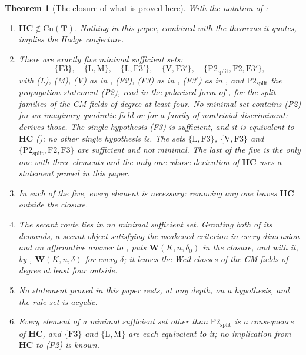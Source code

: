 \documentclass[11pt,reqno]{amsart}
\theoremstyle{plain}
\newtheorem{theorem}{Theorem}[section]
\theoremstyle{definition}
\theoremstyle{remark}
\newcommand{\Cn}{\mathrm{Cn}}
\begin{document}
\begin{theorem}[The closure of what is proved here]\label{thm:closure}
With the notation of :
\begin{enumerate}[label=\textup{(\roman*)},leftmargin=2.6em]
\item $\mathbf{HC}\notin\Cn(\mathbf{T})$. Nothing in this paper, combined with the
  theorems it quotes, implies the Hodge conjecture.
\item There are exactly five minimal sufficient sets:
  \[
    \{\mathrm{F3}\},\quad\{\mathrm{L},\mathrm{M}\},\quad
    \{\mathrm{L},\mathrm{F3}'\},\quad\{\mathrm{V},\mathrm{F3}'\},\quad
    \{\mathrm{P2}_{\mathrm{split}},\mathrm{F2},\mathrm{F3}'\},
  \]
  with \textup{(L)}, \textup{(M)}, \textup{(V)} as in ,
  \textup{(F2)}, \textup{(F3)} as in , (F3$'$) as in
  , and $\mathrm{P2}_{\mathrm{split}}$ the propagation
  statement \textup{(P2)}, read in the polarised form of \cite[Remark~3.6]{paperII},
  for the split families of the CM fields of degree at least four. No
  minimal set contains \textup{(P2)} for an imaginary quadratic field or for
  a family of nontrivial discriminant:  derives those.
  The single hypothesis (F3) is sufficient, and it is equivalent to
  $\mathbf{HC}$ (); no other single hypothesis is.
  The sets $\{\mathrm{L},\mathrm{F3}\}$, $\{\mathrm{V},\mathrm{F3}\}$ and
  $\{\mathrm{P2}_{\mathrm{split}},\mathrm{F2},\mathrm{F3}\}$ are sufficient and
  not minimal. The last of the five is the only one with three elements and the
  only one whose derivation of $\mathbf{HC}$ uses a statement proved in this
  paper.
\item In each of the five, every element is necessary: removing any one
  leaves $\mathbf{HC}$ outside the closure.
\item The secant route lies in no minimal sufficient set. Granting both of its
  demands, a secant object satisfying the weakened criterion in every
  dimension and an affirmative answer to \cite[Question 11.4]{Mar25b}, puts
  $\mathbf{W}(K,n,\delta_{0})$ in the closure, and with it, by
  , $\mathbf{W}(K,n,\delta)$ for every $\delta$; it leaves
  the Weil classes of the CM fields of degree at least four outside.
\item No statement proved in this paper rests, at any depth, on a
  hypothesis, and the rule set is acyclic.
\item Every element of a minimal sufficient set other than
  $\mathrm{P2}_{\mathrm{split}}$ is a consequence of $\mathbf{HC}$, and $\{\mathrm{F3}\}$ and
  $\{\mathrm{L},\mathrm{M}\}$ are each equivalent to it; no implication from
  $\mathbf{HC}$ to \textup{(P2)} is known.
\end{enumerate}
\end{theorem}
\end{document}
